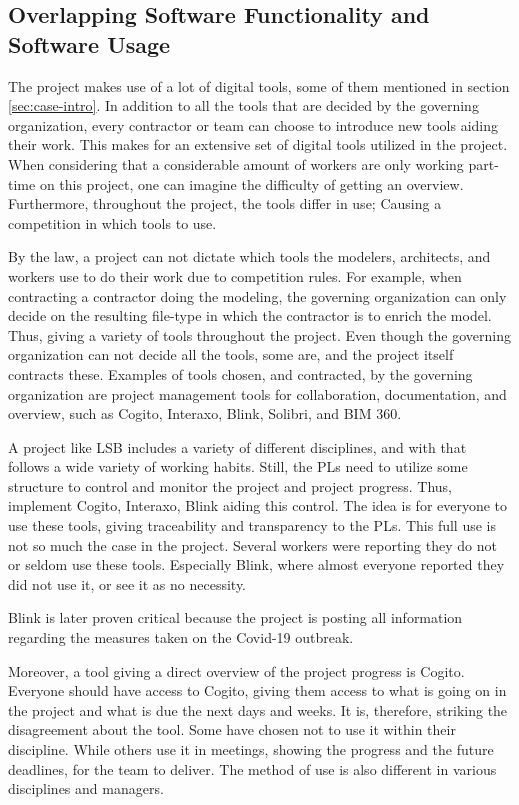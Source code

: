 \subsection{Overlapping Software Functionality and Software Usage} \label{sec:unmitigated}
The project makes use of a lot of digital tools, some of them mentioned in section \ref{sec:case-intro}. In addition to all the tools that are decided by the governing organization, every contractor or team can choose to introduce new tools aiding their work. This makes for an extensive set of digital tools utilized in the project. When considering that a considerable amount of workers are only working part-time on this project, one can imagine the difficulty of getting an overview. Furthermore, throughout the project, the tools differ in use; Causing a competition in which tools to use.

By the law, a project can not dictate which tools the modelers, architects, and workers use to do their work due to competition rules. For example, when contracting a contractor doing the modeling, the governing organization can only decide on the resulting file-type in which the contractor is to enrich the model. Thus, giving a variety of tools throughout the project. Even though the governing organization can not decide all the tools, some are, and the project itself contracts these. Examples of tools chosen, and contracted, by the governing organization are project management tools for collaboration, documentation, and overview, such as Cogito, Interaxo, Blink, Solibri, and BIM 360.

A project like LSB includes a variety of different disciplines, and with that follows a wide variety of working habits. Still, the PLs need to utilize some structure to control and monitor the project and project progress. Thus, implement Cogito, Interaxo, Blink aiding this control. The idea is for everyone to use these tools, giving traceability and transparency to the PLs. This full use is not so much the case in the project. Several workers were reporting they do not or seldom use these tools. Especially Blink, where almost everyone reported they did not use it, or see it as no necessity. 

Blink is later proven critical because the project is posting all information regarding the measures taken on the Covid-19 outbreak.

Moreover, a tool giving a direct overview of the project progress is Cogito.  Everyone should have access to Cogito, giving them access to what is going on in the project and what is due the next days and weeks. It is, therefore, striking the disagreement about the tool. Some have chosen not to use it within their discipline. While others use it in meetings, showing the progress and the future deadlines, for the team to deliver. The method of use is also different in various disciplines and managers. 


